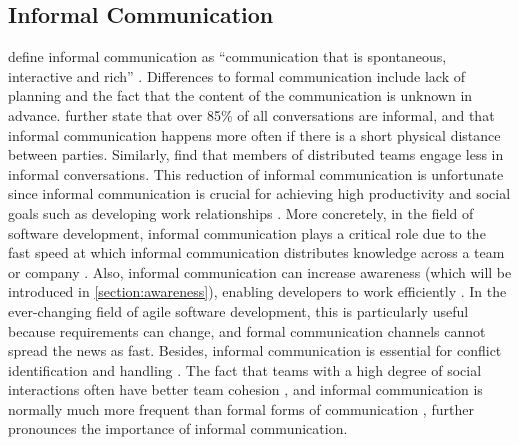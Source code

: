 

\subsection{Informal Communication}
\citeauthor{kraut1990informal} define informal communication as \enquote{communication that is spontaneous, interactive and rich} \autocite[p.~5]{kraut1990informal}. Differences to formal communication include lack of planning and the fact that the content of the communication is unknown in advance. \textcite{kraut1990informal} further state that over 85\% of all conversations are informal, and that informal communication happens more often if there is a short physical distance between parties. Similarly, \textcite{hinds2005understanding} find that members of distributed teams engage less in informal conversations. This reduction of informal communication is unfortunate since informal communication is crucial for achieving high productivity and social goals \autocite{kraut1990informal} such as developing work relationships \autocite{comella2020revisiting, olson2006bridging}. More concretely, in the field of software development, informal communication plays a critical role due to the fast speed at which informal communication distributes knowledge across a team or company \autocite{french1998study, mockus2001challenges}. Also, informal communication can increase awareness (which will be introduced in \autoref{section:awareness}), enabling developers to work efficiently \autocite{herbsleb2001global}. In the ever-changing field of agile software development, this is particularly useful because requirements can change, and formal communication channels cannot spread the news as fast. Besides, informal communication is essential for conflict identification and handling \autocite{hinds2005understanding}. The fact that teams with a high degree of social interactions often have better team cohesion \autocite{staehle2014management}, and informal communication is normally much more frequent than formal forms of communication \autocite{kraut1990informal}, further pronounces the importance of informal communication.

